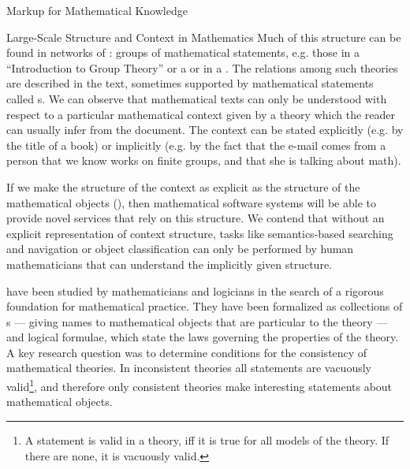 \begin{omgroup}[id=math-markup]{Markup for Mathematical Knowledge}
\begin{module}[id=math-context]
\begin{omgroup}[id=meta-theories]{Large-Scale Structure and Context in Mathematics}
  Much of this structure can be found in networks of {\emph{}}: groups of mathematical statements, e.g. those
  in a  ``Introduction to Group Theory'' or a {} or
  {} in a {}. The relations among such theories are
  described in the text, sometimes supported by mathematical statements called
  {s}. We can observe that mathematical texts can only be
  understood with respect to a particular mathematical context given by a theory which the
  reader can usually infer from the document. The context can be stated explicitly
  (e.g. by the title of a book) or implicitly (e.g. by the fact that the e-mail comes from
  a person that we know works on finite groups, and that she is talking about math).

\begin{omtext}
  If we make the structure of the context as explicit as the structure of the mathematical
  objects (), then mathematical
  software systems will be able to provide novel services that rely on this structure. We
  contend that without an explicit representation of context structure, tasks like
  semantics-based searching and navigation or object classification can only be performed
  by human mathematicians that can understand the implicitly given structure.
\end{omtext}

  {} have been studied by mathematicians
  and logicians in the search of a rigorous foundation for mathematical practice. They
  have been formalized as collections of {s} --- giving names
  to mathematical objects that are particular to the theory --- and logical formulae,
  which state the laws governing the properties of the theory. A key research question was
  to determine conditions for the consistency of mathematical theories. In inconsistent
  theories all statements are vacuously valid\footnote{A statement is valid in a theory,
    iff it is true for all models of the theory. If there are none, it is vacuously
    valid.}, and therefore only consistent theories make interesting statements about
  mathematical objects.


\end{omgroup}
\end{module}
\end{omgroup}
